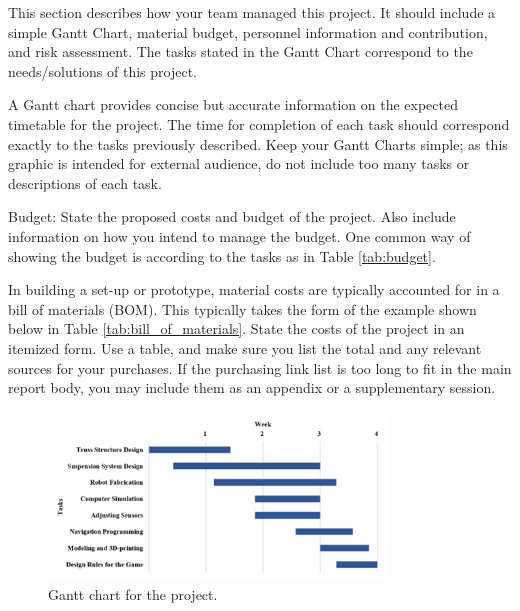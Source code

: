 \documentclass{engr1000j-s2} %
\begin{document}
  This section describes how your team managed this project. It should include a
  simple Gantt Chart, material budget, personnel information and contribution,
  and risk assessment. The tasks stated in the Gantt Chart correspond to the needs/solutions
  of this project.

  A Gantt chart provides concise but accurate information on the expected timetable
  for the project. The time for completion of each task should correspond
  exactly to the tasks previously described. Keep your Gantt Charts simple; as
  this graphic is intended for external audience, do not include too many tasks or
  descriptions of each task.

  Budget: State the proposed costs and budget of the project. Also include information
  on how you intend to manage the budget. One common way of showing the budget
  is according to the tasks as in Table \ref{tab:budget}.

  In building a set-up or prototype, material costs are typically accounted for in
  a bill of materials (BOM). This typically takes the form of the example shown
  below in Table \ref{tab:bill_of_materials}. State the costs of the project in an
  itemized form. Use a table, and make sure you list the total and any relevant sources
  for your purchases. If the purchasing link list is too long to fit in the main
  report body, you may include them as an appendix or a supplementary session.

  \begin{figure}[!ht]
    \centering
    \includegraphics[width=0.8\textwidth]{figures/gantt_chart.png}
    \caption{\quad Gantt chart for the project.}
    \label{fig:gantt_chart}
  \end{figure}
\end{document}
